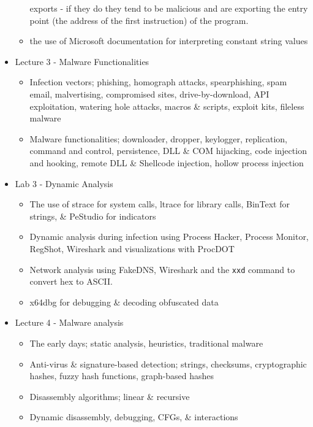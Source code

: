 \documentclass[]{project_plan}
\begin{document}
\begin{itemize}
\begin{itemize}
                exports - if they do they tend to be malicious and are exporting the entry point (the address of the first instruction) of the
                program.
          \item the use of Microsoft documentation for interpreting constant string values
        \end{itemize}
  \item Lecture 3 - Malware Functionalities
        \begin{itemize}
          \item Infection vectors; phishing, homograph attacks, spearphishing, spam
                email, malvertising, compromised sites, drive-by-download, API exploitation,
                watering hole attacks, macros \& scripts, exploit kits, fileless malware
          \item Malware functionalities; downloader, dropper, keylogger, replication,
                command and control, persistence, DLL \& COM hijacking, code injection and hooking,
                remote DLL \& Shellcode injection, hollow process injection
        \end{itemize}
  \item Lab 3 - Dynamic Analysis
        \begin{itemize}
          \item The use of strace for system calls, ltrace for library calls, BinText for strings, \& PeStudio for indicators
          \item Dynamic analysis during infection using Process Hacker, Process
                Monitor, RegShot, Wireshark and visualizations with ProcDOT
          \item Network analysis using FakeDNS, Wireshark and the \lstinline|xxd| command to convert hex to ASCII.
          \item x64dbg for debugging \& decoding obfuscated data
        \end{itemize}
  \item Lecture 4 - Malware analysis
        \begin{itemize}
          \item The early days; static analysis, heuristics, traditional malware
          \item Anti-virus \& signature-based detection; strings, checksums,
                cryptographic hashes, fuzzy hash functions, graph-based hashes
          \item Disassembly algorithms; linear \& recursive
          \item Dynamic disassembly, debugging, CFGs, \& interactions

\end{itemize}
\end{itemize}
\end{document}
